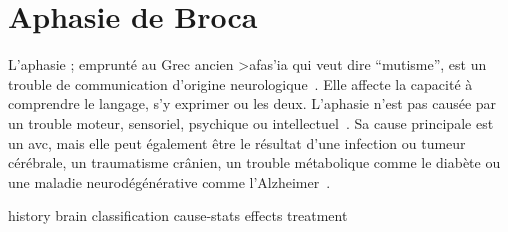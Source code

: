 \section{Aphasie de Broca}

L'aphasie ; emprunté au Grec ancien \textgreek{>afas'ia} qui veut dire ``mutisme'',
est un trouble de communication d'origine neurologique~\cite{Larousse}. 
Elle affecte la capacité à comprendre le langage, s'y exprimer ou les deux.
L'aphasie n'est pas causée par un trouble moteur, sensoriel, psychique ou intellectuel~\cite{Chapey_2008}.
Sa cause principale est un \gls{avc}, 
mais elle peut également être le résultat d'une infection ou tumeur cérébrale, 
un traumatisme crânien, un trouble métabolique comme le diabète 
ou une maladie neurodégénérative comme l'Alzheimer~\cite{Hallowell_2017}.

{history}
{brain}
{classification}
{cause-stats}
{effects}
{treatment}